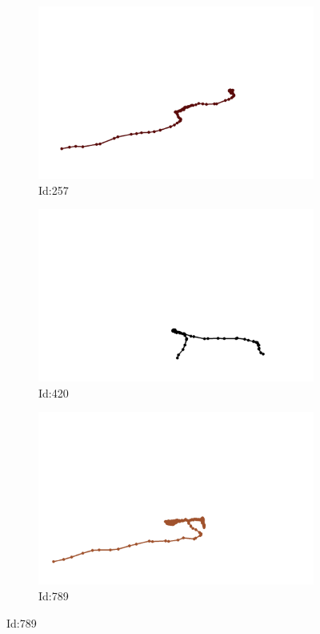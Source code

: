 \documentclass[12pt,twoside]{report}
\begin{document}
\begin{figure}
\centering
\begin{subfigure}[b]{0.20\textwidth}
\centering
\includegraphics[width=\textwidth]{../../trajectories/257.png}
\caption{Id:257}
\end{subfigure}
\begin{subfigure}[b]{0.20\textwidth}
\centering
\includegraphics[width=\textwidth]{../../trajectories/420.png}
\caption{Id:420}
\end{subfigure}
\begin{subfigure}[b]{0.20\textwidth}
\centering
\includegraphics[width=\textwidth]{../../trajectories/789.png}
\caption{Id:789}
\end{subfigure}
\end{figure}
\end{document}
